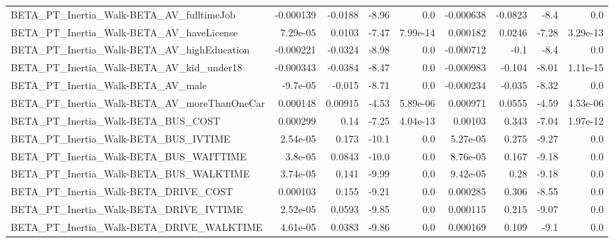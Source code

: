 \begin{tabular}{lrrrrrrrr}
BETA\_PT\_Inertia\_Walk-BETA\_AV\_fulltimeJob           &   -0.000139 &      -0.0188 &    -8.96 &      0.0 &  -0.000638 &     -0.0823 &         -8.4 &           0.0 \\
BETA\_PT\_Inertia\_Walk-BETA\_AV\_haveLicense           &    7.29e-05 &       0.0103 &    -7.47 & 7.99e-14 &   0.000182 &      0.0246 &        -7.28 &      3.29e-13 \\
BETA\_PT\_Inertia\_Walk-BETA\_AV\_highEducation         &   -0.000221 &      -0.0324 &    -8.98 &      0.0 &  -0.000712 &        -0.1 &         -8.4 &           0.0 \\
BETA\_PT\_Inertia\_Walk-BETA\_AV\_kid\_under18           &   -0.000343 &      -0.0384 &    -8.47 &      0.0 &  -0.000983 &      -0.104 &        -8.01 &      1.11e-15 \\
BETA\_PT\_Inertia\_Walk-BETA\_AV\_male                  &    -9.7e-05 &       -0.015 &    -8.71 &      0.0 &  -0.000234 &      -0.035 &        -8.32 &           0.0 \\
BETA\_PT\_Inertia\_Walk-BETA\_AV\_moreThanOneCar        &    0.000148 &      0.00915 &    -4.53 & 5.89e-06 &   0.000971 &      0.0555 &        -4.59 &      4.53e-06 \\
BETA\_PT\_Inertia\_Walk-BETA\_BUS\_COST                 &    0.000299 &         0.14 &    -7.25 & 4.04e-13 &    0.00103 &       0.343 &        -7.04 &      1.97e-12 \\
BETA\_PT\_Inertia\_Walk-BETA\_BUS\_IVTIME               &    2.54e-05 &        0.173 &    -10.1 &      0.0 &   5.27e-05 &       0.275 &        -9.27 &           0.0 \\
BETA\_PT\_Inertia\_Walk-BETA\_BUS\_WAITTIME             &     3.8e-05 &       0.0843 &    -10.0 &      0.0 &   8.76e-05 &       0.167 &        -9.18 &           0.0 \\
BETA\_PT\_Inertia\_Walk-BETA\_BUS\_WALKTIME             &    3.74e-05 &        0.141 &    -9.99 &      0.0 &   9.42e-05 &        0.28 &        -9.18 &           0.0 \\
BETA\_PT\_Inertia\_Walk-BETA\_DRIVE\_COST               &    0.000103 &        0.155 &    -9.21 &      0.0 &   0.000285 &       0.306 &        -8.55 &           0.0 \\
BETA\_PT\_Inertia\_Walk-BETA\_DRIVE\_IVTIME             &    2.52e-05 &       0.0593 &    -9.85 &      0.0 &   0.000115 &       0.215 &        -9.07 &           0.0 \\
BETA\_PT\_Inertia\_Walk-BETA\_DRIVE\_WALKTIME           &    4.61e-05 &       0.0383 &    -9.86 &      0.0 &   0.000169 &       0.109 &         -9.1 &           0.0 \\

\end{tabular}
